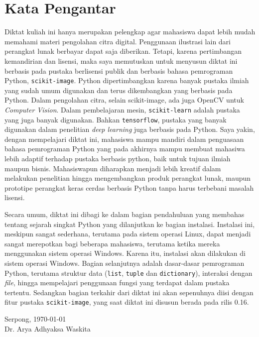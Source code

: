 \chapter*{Kata Pengantar}
Diktat kuliah ini hanya merupakan pelengkap agar mahasiswa dapat lebih mudah memahami materi pengolahan citra digital. Penggunaan ilustrasi lain dari perangkat lunak berbayar dapat saja diberikan. Tetapi, karena pertimbangan kemandirian dan lisensi, maka saya memutuskan untuk menyusun diktat ini berbasis pada pustaka berlisensi publik dan berbasis bahasa pemrograman Python, \texttt{scikit-image}. Python dipertimbangkan karena banyak pustaka ilmiah yang sudah umum digunakan dan terus dikembangkan yang berbasis pada Python. Dalam pengolahan citra, selain scikit-image, ada juga OpenCV untuk \textit{Computer Vision}. Dalam pembelajaran mesin, \texttt{scikit-learn} adalah pustaka yang juga banyak digunakan. Bahkan \texttt{tensorflow}, pustaka yang banyak digunakan dalam penelitian \textit{deep learning} juga berbasis pada Python. Saya yakin, dengan mempelajari diktat ini, mahasiswa mampu mandiri dalam penguasaan bahasa pemrograman Python yang pada akhirnya mampu membuat mahasiwa lebih adaptif terhadap pustaka berbasis python, baik untuk tujuan ilmiah maupun bisnis. Mahasiswapun diharapkan menjadi lebih kreatif dalam melakukan penelitian hingga mengembangkan produk perangkat lunak, maupun prototipe perangkat keras cerdas berbasis Python tanpa harus terbebani masalah lisensi.

Secara umum, diktat ini dibagi ke dalam bagian pendahuluan yang membahas tentang sejarah singkat Python yang dilanjutkan ke bagian instalasi. Instalasi ini, meskipun sangat sederhana, terutama pada sistem operasi Linux, dapat menjadi sangat merepotkan bagi beberapa mahasiswa, terutama ketika mereka menggunakan sistem operasi Windows. Karena itu, instalasi akan dilakukan di sistem operasi Windows. Bagian selanjutnya adalah dasar-dasar pemrograman Python, terutama struktur data (\texttt{list}, \texttt{tuple} dan \texttt{dictionary}), interaksi dengan \textit{file}, hingga mempelajari penggunaan fungsi yang terdapat dalam pustaka tertentu. Sedangkan bagian terkahir dari diktat ini akan sepenuhnya diisi dengan fitur pustaka \texttt{scikit-image}, yang saat diktat ini disusun berada pada rilis 0.16.

\vspace*{0.1cm}
\begin{flushright}
Serpong, \today\\[0.1cm]
\vspace*{1cm}
Dr. Arya Adhyaksa Waskita

\end{flushright}
